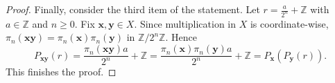 \documentclass[10pt,a4paper]{amsart}
\newcommand{\Z}{\mathbb{Z}}
\begin{document}
\begin{proof}
Finally, consider the third item of the statement.
Let $r=\frac{a}{2^n}+\mathbb Z$ with $a\in\Z$ and $n\ge 0$.
Fix $\mathbf{x},\mathbf{y}\in X$.
Since multiplication in $X$ is coordinate-wise,  
\(
\pi_n(\mathbf{x}\mathbf{y})=\pi_n(\mathbf{x})\pi_n(\mathbf{y})
\)
 in $\mathbb Z/2^n\mathbb Z$.
Hence
\[
P_{\mathbf{x}\mathbf{y}}(r)=\frac{\pi_n(\mathbf{x}\mathbf{y})a}{2^n}+\mathbb Z=\frac{\pi_n(\mathbf{x})\pi_n(\mathbf{y})a}{2^n}+\mathbb Z=P_\mathbf{x}(P_\mathbf{y}(r)).
\]
This finishes the proof.
\end{proof}
\end{document}
